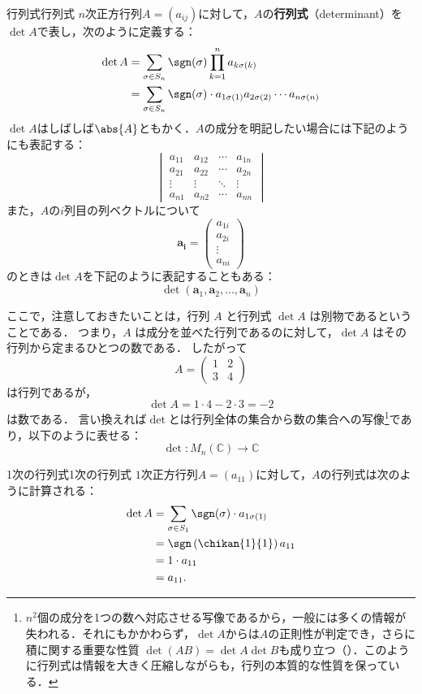 \begin{definition}{行列式}{行列式}
  $n$次正方行列$A = (a_{ij})$に対して，$A$の\textbf{行列式}（determinant）を$\det A $で表し，次のように定義する：
  \begin{align*}
  \det A &=\sum_{\sigma \in S_n} \sgn(\sigma) \prod_{k=1}^n a_{k\sigma(k)} \\
  &=  \sum_{\sigma \in S_n} \sgn(\sigma) \cdot a_{1\sigma(1)} a_{2\sigma(2)} \dotsm a_{n\sigma(n)}
  \end{align*}
  $\det A$はしばしば$\abs{A}$ともかく．$A$の成分を明記したい場合には下記のようにも表記する：
  \[
  \begin{vmatrix}
  a_{11}  & a_{12}  & \cdots & a_{1n} \\
  a_{21}  & a_{22}  & \cdots & a_{2n} \\
  \vdots  & \vdots  & \ddots & \vdots \\
  a_{n1}  & a_{n2}  & \cdots & a_{nn}
  \end{vmatrix}
  \]
  また，$A$の$i$列目の列ベクトルについて
  \[
   \bm{a_i} =\begin{pmatrix} a_{1i}\\ a_{2i}  \\ \vdots \\ a_{ni} \end{pmatrix}
  \]
  のときは$\det A$を下記のように表記することもある：
  \[
  \det(\bm{a}_1, \bm{a}_2, \dots, \bm{a}_n)
  \]
\end{definition}

ここで，注意しておきたいことは，行列 $A$ と行列式 $\det A$ は別物であるということである．
つまり，$A$ は成分を並べた行列であるのに対して，$\det A$ はその行列から定まるひとつの数である．
したがって
\[
A=\begin{pmatrix}
1 & 2\\
3 & 4
\end{pmatrix}
\]
は行列であるが，
\[
\det A=1\cdot4-2\cdot3=-2
\]
は数である．
言い換えれば$\det$とは行列全体の集合から数の集合への写像\footnote{$n^2$個の成分を1つの数へ対応させる写像であるから，一般には多くの情報が失われる．それにもかかわらず，$\det A$からは$A$の正則性が判定でき，さらに積に関する重要な性質
$\det(AB)=\det A\det B$も成り立つ（）．このように行列式は情報を大きく圧縮しながらも，行列の本質的な性質を保っている．}であり，以下のように表せる：
\[
\det \colon M_n(\mathbb{C}) \to \mathbb{C}
\]

\begin{example}{1次の行列式}{1次の行列式}
  $1$次正方行列$A = (a_{11})$に対して，$A$の行列式は次のように計算される：
  \begin{align*}
    \det A &= \sum_{\sigma \in S_1} \sgn(\sigma) \cdot a_{1\sigma(1)} \\
    &= \sgn\left( \chikan{1}{1} \right) a_{11} \\
    &= 1 \cdot a_{11} \\
    &= a_{11}.
  \end{align*}
\end{example}

